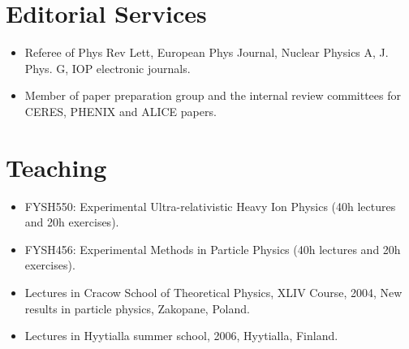 \documentclass[12pt]{article}
\begin{document}
\section{Editorial Services}
\begin{itemize}
\item Referee of Phys Rev Lett, European Phys Journal, Nuclear Physics A, J. Phys. G, IOP electronic journals.
\item Member of paper preparation group and the internal review committees for CERES, PHENIX and ALICE papers.

\end{itemize}

\section{Teaching}
\begin{itemize}
\item FYSH550: Experimental Ultra-relativistic Heavy Ion Physics (40h lectures and 20h exercises).
\item FYSH456: Experimental Methods in Particle Physics  (40h lectures and 20h exercises).
\item Lectures in Cracow School of Theoretical Physics, XLIV Course, 2004, New results in particle 
physics, Zakopane, Poland.
\item Lectures in Hyytialla summer school, 2006, Hyytialla, Finland.
\end{itemize}
\end{document}
